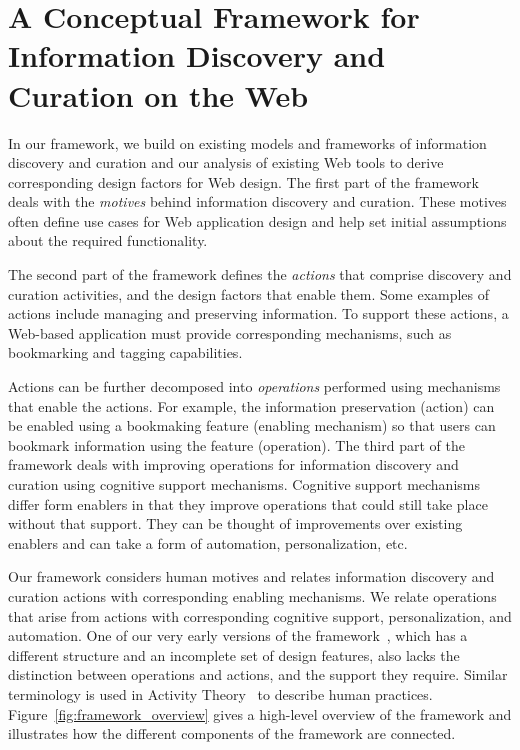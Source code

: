\documentclass[review]{elsarticle}
\begin{document}
{\section{A Conceptual Framework for Information Discovery and Curation on the Web}
\label{sec:framework}

In our framework, we build on existing models and frameworks of information discovery and curation and our analysis of existing Web tools to derive corresponding design factors for Web design. The first part of the framework deals with the \textit{motives} behind information discovery and curation. These motives often define use cases for Web application design and help set initial assumptions about the required functionality.

The second part of the framework defines the \textit{actions} that comprise discovery and curation activities, and the design factors that enable them. Some examples of actions include managing and preserving information. To support these actions, a Web-based application must provide corresponding mechanisms, such as bookmarking and tagging capabilities.

Actions can be further decomposed into \textit{operations} performed using mechanisms that enable the actions. For example, the information preservation (action) can be enabled using a bookmaking feature (enabling mechanism) so that users can bookmark information using the feature (operation). The third part of the framework deals with improving operations for information discovery and curation using cognitive support mechanisms. Cognitive support mechanisms differ form enablers in that they improve operations that could still take place without that support. They can be thought of improvements over existing enablers and can take a form of automation, personalization, etc.

Our framework considers human motives and relates information discovery and curation actions with corresponding enabling mechanisms. We relate operations that arise from actions with corresponding cognitive support, personalization, and automation. One of our very early versions of the framework~\cite{voyloshnikova2014}, which has a different structure and an incomplete set of design features, also lacks the distinction between operations and actions, and the support they require. Similar terminology is used in Activity Theory~\cite{kuutti1996activity} to describe human practices. Figure~\ref{fig:framework_overview} gives a high-level overview of the framework and illustrates how the different components of the framework are connected.


}
\end{document}
